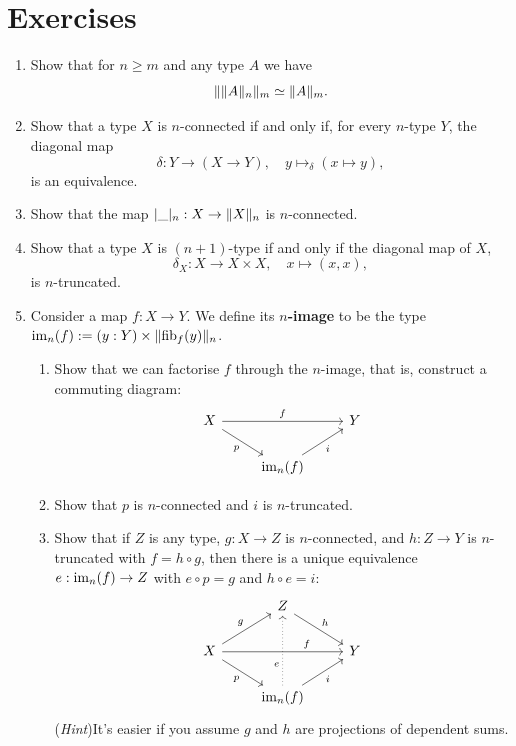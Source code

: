\documentclass[10pt,oneside,leqno,openright]{memoir}
\begin{document}
\section{Exercises}
\begin{enumerate}
    \item Show that for $n \geq m$ and any type $A$ we have
    \[ \lVert\lVert A\rVert_n\rVert_m \simeq \lVert A\rVert_m. \]

  \item\label{ex:n-conn-orth}
    Show that a type $X$ is $n$-connected if and only if, for every $n$-type $Y$,
    the diagonal map
    \[ \delta: Y \to (X \to Y), \quad y\mapsto_\delta (x\mapsto y),
    \]
    is an equivalence.

  \item Show that the map $\lvert\_\rvert_n : X \to \lVert X\rVert_n$ is $n$-connected.

  \item Show that a type $X$ is $(n+1)$-type if and only if the diagonal map of $X$,
    \[\delta_X : X \to X\times X,\quad x\mapsto (x,x),\]
    is $n$-truncated.
    
    \item Consider a map $f : X \to Y$.
      We define its \textbf{$n$-image} to be the type $\operatorname{im}_n(f) :=
      (y : Y) \times \lVert\operatorname{fib}_f(y)\rVert_n$.
    \begin{enumerate}
    \item Show that we can factorise $f$ through the $n$-image, that is,
      construct a commuting diagram:
        \[\begin{tikzcd}
            X \ar[rr, "f"] \ar[dr, swap, "p"] & & Y \\
            & \im_n(f) \ar[ur, swap, "i"]
        \end{tikzcd}\]
    \item Show that $p$ is $n$-connected and $i$ is $n$-truncated.
    \item Show that if $Z$ is any type, $g : X \to Z$ is $n$-connected, and $h:Z\to Y$ is $n$-truncated with $f = h\circ g$, then there is a unique equivalence $e : \operatorname{im}_n(f) \to Z$ with $e\circ p = g$ and $h\circ e = i$:
      \[
        \begin{tikzcd}
      & Z \ar[dr,"h"] & \\
      X \ar[rr,pos=0.7,"f"]\ar[dr,"p"'] \ar[ur,"g"]& & Y\\
      & \im_n(f)\ar[ur,"i"']\ar[uu,dotted,pos=0.3, "e"] &
    \end{tikzcd}
  \]
  (\emph{Hint})\enspace It's easier if you assume $g$ and $h$ are projections of
  dependent sums.
    \end{enumerate}


\end{enumerate}
\end{document}
